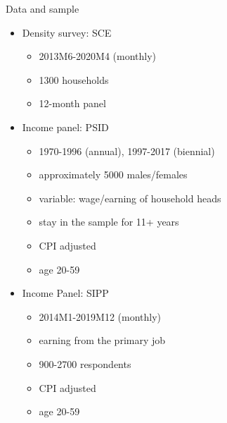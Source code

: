 \documentclass{beamer}
\begin{document}
\begin{frame}{Data and sample}
	\begin{itemize}
		\item Density survey: SCE
		\begin{itemize}
			\item 2013M6-2020M4   (monthly)
			\item 1300 households 
			\item 12-month panel 
		\end{itemize}
\item Income panel: PSID 
\begin{itemize}
	\item 1970-1996 (annual), 1997-2017 (biennial) 
	\item approximately 5000 males/females 
	\item variable: wage/earning of household heads 
	\item stay in the sample for 11+ years
	\item CPI adjusted 
	\item age 20-59 
\end{itemize}
\item Income Panel: SIPP
\begin{itemize}
	\item 2014M1-2019M12 (monthly)
	\item earning from the primary job 
	\item 900-2700 respondents 
		\item CPI adjusted 
	\item age 20-59

\end{itemize}
\end{itemize}
\end{frame}


\end{document}
